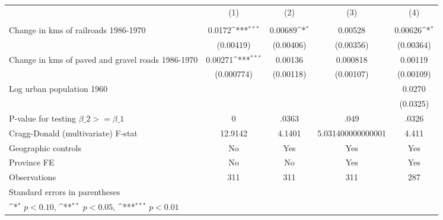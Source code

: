 {
\def\sym#1{\ifmmode^{#1}\else\(^{#1}\)\fi}
\begin{tabular}{l*{4}{c}}
\hline\hline
                &\multicolumn{1}{c}{(1)}&\multicolumn{1}{c}{(2)}&\multicolumn{1}{c}{(3)}&\multicolumn{1}{c}{(4)}\\
                &\multicolumn{1}{c}{}&\multicolumn{1}{c}{}&\multicolumn{1}{c}{}&\multicolumn{1}{c}{}\\
\hline
Change in kms of railroads 1986-1970&   0.0172\sym{***}&  0.00689\sym{*}  &  0.00528         &  0.00626\sym{*}  \\
                &(0.00419)         &(0.00406)         &(0.00356)         &(0.00364)         \\
[1em]
Change in kms of paved and gravel roads 1986-1970&  0.00271\sym{***}&  0.00136         & 0.000818         &  0.00119         \\
                &(0.000774)         &(0.00118)         &(0.00107)         &(0.00109)         \\
[1em]
Log urban population 1960&                  &                  &                  &   0.0270         \\
                &                  &                  &                  & (0.0325)         \\
\hline
P-value for testing $\beta\_{2} >= \beta\_{1}$&        0         &    .0363         &     .049         &    .0326         \\
Cragg-Donald (multivariate) F-stat&  12.9142         &   4.1401         &5.031400000000001         &    4.411         \\
Geographic controls&       No         &      Yes         &      Yes         &      Yes         \\
Province FE     &       No         &       No         &      Yes         &      Yes         \\
Observations    &      311         &      311         &      311         &      287         \\
\hline\hline
\multicolumn{5}{l}{\footnotesize Standard errors in parentheses}\\
\multicolumn{5}{l}{\footnotesize \sym{*} \(p<0.10\), \sym{**} \(p<0.05\), \sym{***} \(p<0.01\)}\\
\end{tabular}
}
